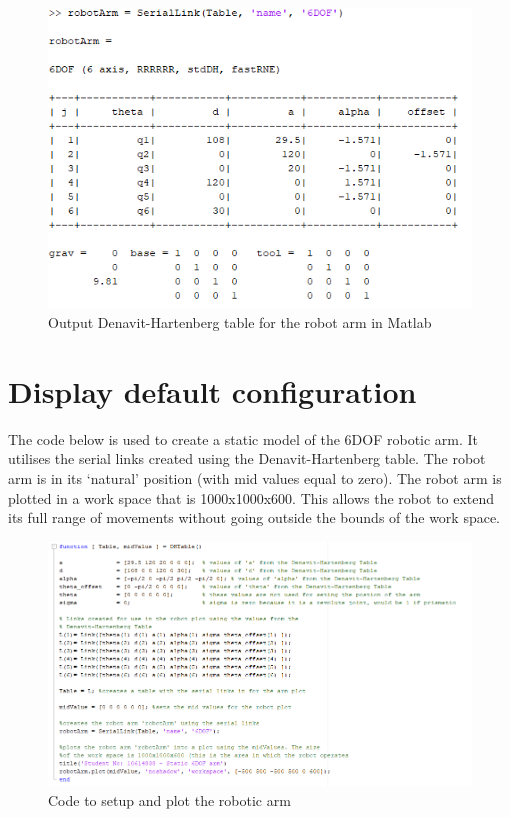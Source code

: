 \documentclass [11pt]{report}
\begin{document}
\begin{figure}[H]
\centerline{\includegraphics[width=12cm]{robotArmDHTable.png}}
\caption{Output Denavit-Hartenberg table for the robot arm in Matlab}
\label{fig}
\end{figure}

\section{Display default configuration}

The code below is used to create a static model of the 6DOF robotic arm. It utilises the serial links created using the Denavit-Hartenberg table. The robot arm is in its `natural' position (with mid values equal to zero). The robot arm is plotted in a work space that is 1000x1000x600. This allows the robot to extend its full range of movements without going outside the bounds of the work space. 

\begin{figure}[H]
\centerline{\includegraphics[width=12cm]{StaticRoboticArmCode.png}}
\caption{Code to setup and plot the robotic arm}
\label{fig}
\end{figure}
\end{document}

